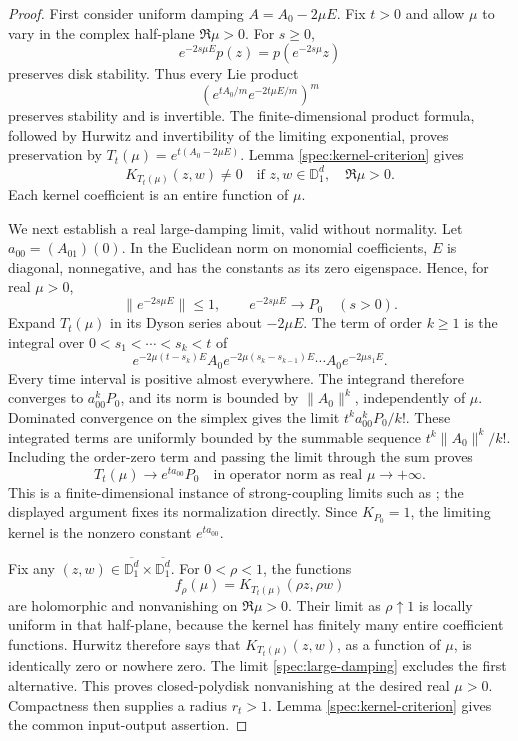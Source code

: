 \documentclass[reqno]{amsart}
\theoremstyle{definition}
\theoremstyle{remark}
\newcommand{\D}{\mathbb D}
\begin{document}
\begin{proof}
First consider uniform damping \(A=A_0-2\mu E\).  Fix \(t>0\)
and allow \(\mu\) to vary in the complex half-plane \(\Re\mu>0\).
For \(s\ge0\),
\[
 e^{-2s\mu E}p(z)=p(e^{-2s\mu}z)
\]
preserves disk stability.  Thus every Lie product
\[
 \left(e^{tA_0/m}e^{-2t\mu E/m}\right)^m
\]
preserves stability and is invertible.  The finite-dimensional product
formula, followed by Hurwitz and invertibility of the limiting
exponential, proves preservation by
\(T_t(\mu)=e^{t(A_0-2\mu E)}\).  Lemma
\ref{spec:kernel-criterion} gives
\begin{equation}\label{spec:open-complex-field}
 K_{T_t(\mu)}(z,w)\ne0
 \quad\text{if }z,w\in\D_1^d,\quad\Re\mu>0.
\end{equation}
Each kernel coefficient is an entire function of \(\mu\).

We next establish a real large-damping limit, valid without normality.
Let \(a_{00}=(A_01)(0)\).  In the Euclidean norm on monomial
coefficients, \(E\) is diagonal, nonnegative, and has the constants
as its zero eigenspace.  Hence, for real \(\mu>0\),
\[
 \|e^{-2s\mu E}\|\le1,
 \qquad e^{-2s\mu E}\longrightarrow P_0\quad(s>0).
\]
Expand \(T_t(\mu)\) in its Dyson series about \(-2\mu E\).
The term of order \(k\ge1\) is the integral over
\(0<s_1<\cdots<s_k<t\) of
\[
 e^{-2\mu(t-s_k)E}A_0e^{-2\mu(s_k-s_{k-1})E}
 \cdots A_0e^{-2\mu s_1E}.
\]
Every time interval is positive almost everywhere.  The integrand
therefore converges to \(a_{00}^kP_0\), and its norm is bounded by
\(\|A_0\|^k\), independently of \(\mu\).  Dominated convergence
on the simplex gives the limit \(t^ka_{00}^kP_0/k!\).  These integrated
terms are uniformly bounded by the summable sequence
\(t^k\|A_0\|^k/k!\).  Including the order-zero term and passing
the limit through the sum proves
\begin{equation}\label{spec:large-damping}
 T_t(\mu)\longrightarrow e^{ta_{00}}P_0
 \quad\text{in operator norm as real }\mu\longrightarrow+\infty.
\end{equation}
This is a finite-dimensional instance of strong-coupling limits such as
\cite[Theorem~1]{Burgarth19}; the displayed argument fixes its
normalization directly.  Since \(K_{P_0}=1\), the limiting kernel is
the nonzero constant \(e^{ta_{00}}\).

Fix any \((z,w)\in\overline{\D_1^d}\times\overline{\D_1^d}\).
For \(0<\rho<1\), the functions
\[
 f_\rho(\mu)=K_{T_t(\mu)}(\rho z,\rho w)
\]
are holomorphic and nonvanishing on \(\Re\mu>0\).  Their limit as
\(\rho\uparrow1\) is locally uniform in that half-plane, because
the kernel has finitely many entire coefficient functions.  Hurwitz
therefore says that \(K_{T_t(\mu)}(z,w)\), as a function of
\(\mu\), is identically zero or nowhere zero.  The limit
\eqref{spec:large-damping} excludes the first alternative.  This proves
closed-polydisk nonvanishing at the desired real \(\mu>0\).
Compactness then supplies a radius \(r_t>1\).  Lemma
\ref{spec:kernel-criterion} gives the common input-output assertion.


\end{proof}
\end{document}
